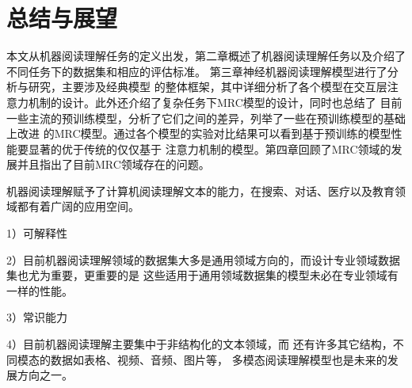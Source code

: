 \documentclass{article}
\begin{document}
%
%

\section{总结与展望}
本文从机器阅读理解任务的定义出发，第二章概述了机器阅读理解任务以及介绍了不同任务下的数据集和相应的评估标准。
第三章神经机器阅读理解模型进行了分析与研究，主要涉及经典模型
的整体框架，其中详细分析了各个模型在交互层注意力机制的设计。此外还介绍了复杂任务下MRC模型的设计，同时也总结了
目前一些主流的预训练模型，分析了它们之间的差异，列举了一些在预训练模型的基础上改进
的MRC模型。通过各个模型的实验对比结果可以看到基于预训练的模型性能要显著的优于传统的仅仅基于
注意力机制的模型。第四章回顾了MRC领域的发展并且指出了目前MRC领域存在的问题。

机器阅读理解赋予了计算机阅读理解文本的能力，在搜索、对话、医疗以及教育领域都有着广阔的应用空间。

1）可解释性

2）目前机器阅读理解领域的数据集大多是通用领域方向的，而设计专业领域数据集也尤为重要，更重要的是
这些适用于通用领域数据集的模型未必在专业领域有一样的性能。

3）常识能力


4）目前机器阅读理解主要集中于非结构化的文本领域，而
还有许多其它结构，不同模态的数据如表格、视频、音频、图片等，
多模态阅读理解模型也是未来的发展方向之一。




\printbibliography[title={参考文献}]
\end{document}

